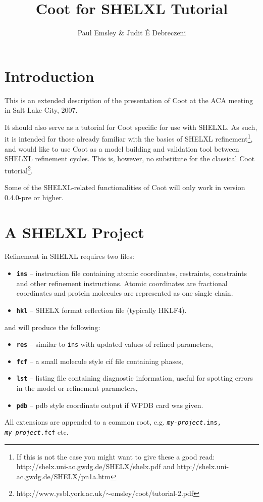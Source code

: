 \documentclass{article}
\begin{document}
\title{Coot for SHELXL Tutorial}
\author{Paul Emsley \& Judit \'{E} Debreczeni}

\maketitle
\tableofcontents

\pagebreak
\section{Introduction}

This is an extended description of the presentation of Coot at the ACA meeting in Salt Lake City, 2007.

It should also serve as a tutorial for Coot specific for use with SHELXL. As such, it is intended for those already familiar with the basics of SHELXL refinement\footnote{If this is not the case you might want to give these a good read:\\http://shelx.uni-ac.gwdg.de/SHELX/shelx.pdf and http://shelx.uni-ac.gwdg.de/SHELX/pn1a.htm}, and would like to use Coot as a model building and validation tool between SHELXL refinement cycles. This is, however, no substitute for the classical Coot tutorial\footnote{http://www.ysbl.york.ac.uk/$\sim$emsley/coot/tutorial-2.pdf}.

Some of the SHELXL-related functionalities of Coot will only work in version 0.4.0-pre or higher.

\section{A SHELXL Project}
Refinement in SHELXL requires two files:
\begin{itemize}
\item {\bf \texttt{ins}} -- instruction file containing atomic coordinates, restraints, constraints and other refinement instructions. Atomic coordinates are fractional coordinates and protein molecules are represented as one single chain.
\item {\bf \texttt{hkl}} -- SHELX format reflection file (typically HKLF4).
\end{itemize}
and will produce the following:
\begin{itemize}
\item {\bf \texttt{res}} -- similar to \texttt{ins} with updated values of refined parameters,
\item {\bf \texttt{fcf}} -- a small molecule style cif file containing phases,
\item {\bf \texttt{lst}} -- listing file containing diagnostic information, useful for spotting errors in the model or refinement parameters,
\item {\bf \texttt{pdb}} -- pdb style coordinate output if WPDB card was given.
\end{itemize}
All extensions are appended to a common root, e.g. \texttt{\emph{my-project}.ins,\\\emph{my-project}.fcf} etc.
\end{document}
